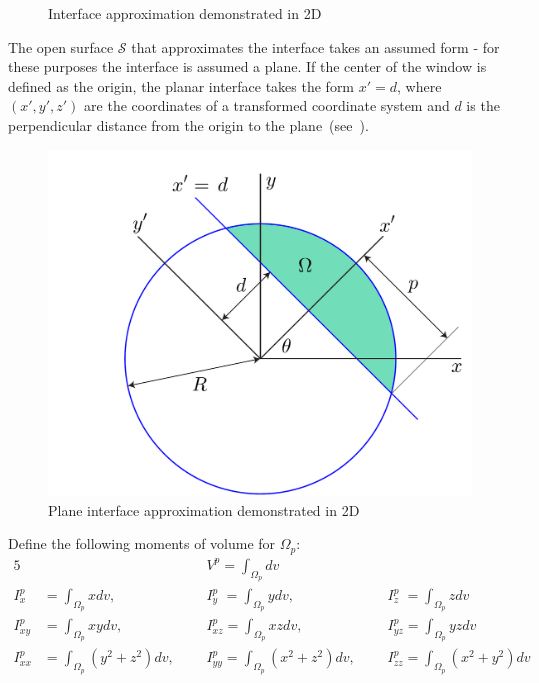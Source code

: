 \begin{figure}[ht]
{\label{fig:subfigure6}}

\caption{Interface approximation demonstrated in 2D}
\label{fig:figure3}
\end{figure}

The open surface $\mathcal{S}$ that approximates the interface takes an assumed form - for these purposes the interface is assumed a plane. If the center of the window is defined as the origin, the planar interface takes the form $x' = d$, where $(x',y',z')$ are the coordinates of a transformed coordinate system and $d$ is the perpendicular distance from the origin to the plane~(see~).

\begin{figure}[ht!]
	\centering
		\includegraphics[scale=0.3]{media/om/window.pdf}
	\caption{Plane interface approximation demonstrated in 2D}
	\label{fig:quad}
\end{figure}

Define the following moments of volume for $\Omega_p$:
\begin{alignat}{5}
&{} &&V^p = \int_{\Omega_p}dv &&{} \\
I_{x\phantom{z}}^p &= \int_{\Omega_p}xdv, &&I_{y\phantom{z}}^p = \int_{\Omega_p}ydv, &&I_{z\phantom{z}}^p = \int_{\Omega_p}zdv \\
I^p_{xy} &= \int_{\Omega_p}xydv, &&I^p_{xz} = \int_{\Omega_p}xzdv, &&I^p_{yz} = \int_{\Omega_p}yzdv \\
I^p_{xx} &= \int_{\Omega_p}(y^2 + z^2)dv, \text{\ \ \ \ \ \ }&&I^p_{yy} = \int_{\Omega_p}(x^2 + z^2)dv, \text{\ \ \ \ \ \ }&&I^p_{zz} = \int_{\Omega_p}(x^2 + y^2)dv
\end{alignat}

